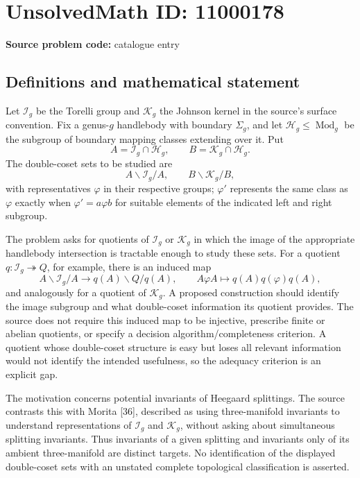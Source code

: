 \documentclass[11pt]{article}
\begin{document}
\section*{UnsolvedMath ID: 11000178}
\textbf{Source problem code:} catalogue entry
\subsection{Definitions and mathematical statement}
Let \(\mathcal I_g\) be the Torelli group and \(\mathcal K_g\) the Johnson kernel in the source's surface convention. Fix a genus-\(g\) handlebody with boundary \(\Sigma_g\), and let \(\mathcal H_g\leq\operatorname{Mod}_g\) be the subgroup of boundary mapping classes extending over it. Put
\[A=\mathcal I_g\cap\mathcal H_g,\qquad B=\mathcal K_g\cap\mathcal H_g.\]
The double-coset sets to be studied are
\[A\backslash\mathcal I_g/A,\qquad B\backslash\mathcal K_g/B,\]
with representatives \(\varphi\) in their respective groups; \(\varphi'\) represents the same class as \(\varphi\) exactly when \(\varphi'=a\varphi b\) for suitable elements of the indicated left and right subgroup.

The problem asks for quotients of \(\mathcal I_g\) or \(\mathcal K_g\) in which the image of the appropriate handlebody intersection is tractable enough to study these sets. For a quotient \(q:\mathcal I_g\twoheadrightarrow Q\), for example, there is an induced map
\[A\backslash\mathcal I_g/A\longrightarrow q(A)\backslash Q/q(A),\qquad
A\varphi A\longmapsto q(A)q(\varphi)q(A),\]
and analogously for a quotient of \(\mathcal K_g\). A proposed construction should identify the image subgroup and what double-coset information its quotient provides. The source does not require this induced map to be injective, prescribe finite or abelian quotients, or specify a decision algorithm/completeness criterion. A quotient whose double-coset structure is easy but loses all relevant information would not identify the intended usefulness, so the adequacy criterion is an explicit gap.

The motivation concerns potential invariants of Heegaard splittings. The source contrasts this with Morita [36], described as using three-manifold invariants to understand representations of \(\mathcal I_g\) and \(\mathcal K_g\), without asking about simultaneous splitting invariants. Thus invariants of a given splitting and invariants only of its ambient three-manifold are distinct targets. No identification of the displayed double-coset sets with an unstated complete topological classification is asserted.
\end{document}
